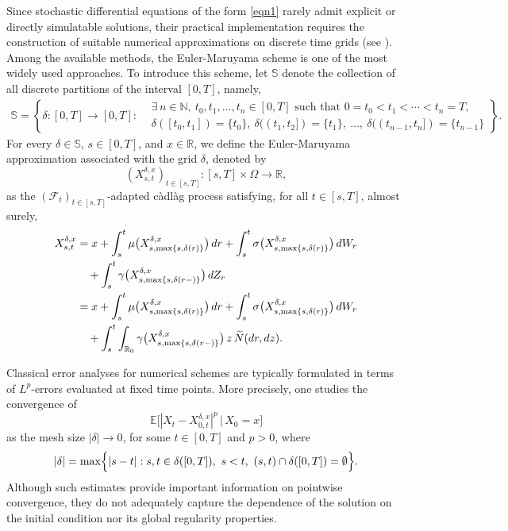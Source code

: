 \documentclass[11pt]{article}
\theoremstyle{theorem}
\theoremstyle{definition}
\newcommand{\bN}{\mathbb{N}}
\newcommand{\1}{{\bf 1}}
\begin{document}
Since stochastic differential equations of the form \eqref{eqn1} rarely admit explicit or directly simulatable solutions, their practical implementation requires the construction of suitable numerical approximations on discrete time grids (see \cite{KP92}). Among the available methods, the Euler-Maruyama scheme is one of the most widely used approaches. To introduce this scheme, let \(\mathbb{S}\) denote the collection of all discrete partitions of the interval \([0,T]\), namely,
\begin{align*}
 \mathbb{S}=\left \{
\delta: [0, T]\to [0, T]: 
\begin{aligned}
&\exists\, n\in\bN,\ t_0,t_1,\dots,t_n\in [0,T] \text{ such that } 0=t_0<t_1<\cdots<t_n=T, \\
&\delta([t_0,t_1])=\{t_0\},\ \delta((t_1,t_2])=\{t_1\},\ \ldots,\ 
\delta((t_{n-1},t_n])=\{t_{n-1}\}
\end{aligned}
\right\}.
\end{align*}
For every \(\delta\in\mathbb{S}\), \(s\in[0,T]\), and \(x\in\mathbb{R}\), we define the Euler-Maruyama approximation associated with the grid \(\delta\), denoted by
\[
(X^{\delta,x}_{s,t})_{t\in[s,T]}:[s,T]\times\Omega\to\mathbb{R},
\]
as the \((\mathcal{F}_t)_{t\in[s,T]}\)-adapted c\`adl\`ag process satisfying, for all \(t\in[s,T]\), almost surely,
\begin{align}
\label{y01}
 X^{\delta,x}_{s,t}
&=
x+\int_{s}^{t}\mu\bigl(X^{\delta,x}_{s,\max\{s,\delta(r)\}}\bigr)\,dr
+\int_{s}^{t}\sigma\bigl(X^{\delta,x}_{s,\max\{s,\delta(r)\}}\bigr)\,dW_r
\notag\\
&\quad
+\int_{s}^{t}\gamma\bigl(X^{\delta,x}_{s,\max\{s,\delta(r-)\}}\bigr)\,dZ_r
\notag\\
&=
x+\int_{s}^{t}\mu\bigl(X^{\delta,x}_{s,\max\{s,\delta(r)\}}\bigr)\,dr
+\int_{s}^{t}\sigma\bigl(X^{\delta,x}_{s,\max\{s,\delta(r)\}}\bigr)\,dW_r
\notag\\
&\quad
+\int_{s}^{t}\int_{\mathbb{R}_0}
\gamma\bigl(X^{\delta,x}_{s,\max\{s,\delta(r-)\}}\bigr)
\,z\,\widetilde{N}(dr,dz).
\end{align}

Classical error analyses for numerical schemes are typically formulated in terms of \(L^p\)-errors evaluated at fixed time points. More precisely, one studies the convergence of
\[
\mathbb{E}\bigl[|X_t-X^{\delta,x}_{0,t}|^p \,\big|\, X_0=x\bigr]
\]
as the mesh size \(|\delta|\to0\), for some \(t\in[0,T]\) and \(p>0\), where
\[
|\delta|
=
\max\Bigl\{
|s-t|:
s,t\in\delta([0,T]),\ s<t,\ (s,t)\cap\delta([0,T])=\emptyset
\Bigr\}.
\]
Although such estimates provide important information on pointwise convergence, they do not adequately capture the dependence of the solution on the initial condition nor its global regularity properties.
\end{document}
